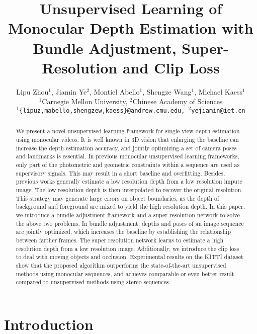 \documentclass[10pt,twocolumn,letterpaper]{article}
\begin{document}
\title{Unsupervised Learning of Monocular Depth Estimation with Bundle Adjustment, Super-Resolution and Clip Loss}

\author{Lipu Zhou$^1$, Jiamin Ye$^2$, Montiel Abello$^1$, Shengze Wang$^1$, Michael Kaess$^1$\\
$^1$Carnegie Mellon University, $^2$Chinese Academy of Sciences\\
{\tt\small $^1$\{lipuz,mabello,shengzew,kaess\}@andrew.cmu.edu, $^2$yejiamin@iet.cn}
}


\maketitle

\begin{abstract}
We present a novel unsupervised learning framework for single view depth estimation using monocular videos. It is well known in 3D vision that enlarging the baseline can increase the depth estimation accuracy, and jointly optimizing a set of camera poses and landmarks is essential. In previous monocular unsupervised learning frameworks, only part of the photometric and geometric constraints within a sequence are used as supervisory signals. This may result in a short baseline and overfitting.  Besides, previous works generally estimate a low resolution depth from a low resolution impute image. The low resolution depth is then interpolated to recover the original resolution. This strategy may generate large errors on object boundaries, as the depth of background and foreground are mixed to yield the high resolution depth. In this paper, we introduce a bundle adjustment framework and a super-resolution network to solve the above two problems. In bundle adjustment, depths and poses of an image sequence are jointly optimized, which increases the baseline by establishing the relationship between farther frames. The super resolution network learns to estimate a high resolution depth from a low resolution image. Additionally, we introduce the clip loss to deal with moving objects and occlusion.  Experimental results on the KITTI dataset show that the proposed algorithm outperforms the state-of-the-art unsupervised methods using monocular sequences, and achieves comparable or even better result compared to  unsupervised methods using stereo sequences.
\end{abstract}

\section{Introduction}
\end{document}
